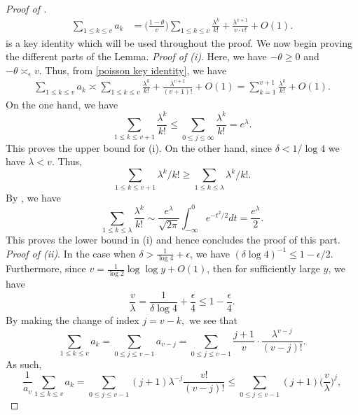 \documentclass{amsart}
\theoremstyle{definition}
\numberwithin{equation}{section}
\newcommand{\density}{\delta}
\begin{document}
\begin{proof}[Proof of ]
	\begin{align}\label{poisson key identity}
		\sum_{1 \leq k \leq v}a_k &= \bigg(\frac{1-\theta}{v}\bigg)\sum_{1 \leq k \leq  v}\frac{\lambda^k}{k!} + \frac{\lambda^{v+1}}{v\cdot v!} +O(1).
	\end{align}
	 is a key identity which will be used throughout the proof. We now begin proving the different parts of the Lemma. 
	\medskip\newline\noindent\textit{Proof of (i)}. Here, we have $- \theta \geq 0$ and $-\theta \asymp_\epsilon v.$ Thus, from \eqref{poisson key identity}, we have
	\begin{align}\label{poisson lemma i eq 1}
		\sum_{1\le k\le v}a_k \asymp \sum_{1\le k\le v}\frac{\lambda^k}{k!} + \frac{\lambda^{v+1}}{(v+1)!}+O(1) =  \sum_{k=1}^{v+1} \frac{\lambda^k}{k!}+O(1).
	\end{align}
	On the one hand, we have
	$$ \sum_{1 \leq k \leq v+1} \frac{\lambda^k}{k!} \leq \sum_{0 \leq j \leq \infty}\frac{\lambda^k}{k!} = e^\lambda.$$
	This proves the upper bound for (i). On the other hand, since $\delta < 1/\log 4$ we have $\lambda < v$. Thus, \begin{equation}\label{eq cite for part iv 1}
		\sum_{1\le k\le v+1}\lambda^k/k!  \ge \sum_{1\le k\le \lambda}\lambda^k/k!.
	\end{equation}
	By , we have
	\begin{equation}\label{eq cite for part iv 2}
		\sum_{1\le k\le \lambda}\frac{\lambda^k}{k!} \sim \frac{e^\lambda}{\sqrt{2 \pi}} \int_{-\infty}^{0}e^{-t^2/2}dt = \frac{e^{\lambda}}{2}.
	\end{equation}
	This proves the lower bound in (i) and hence concludes the proof of this part.
	\noindent\medskip\newline\textit{Proof of (ii)}. In the case when $\density > \frac{1}{\log 4}+\epsilon$, we have $(\delta \log 4)^{-1} \leq 1-\epsilon/2$. Furthermore, since $v = \frac{1}{\log 2} \log \log y + O(1)$, then for sufficiently large $y$, we have 
	\begin{equation}\label{eq poisson lemma v/lambda}
		\frac{v}{\lambda} = \frac{1}{\delta \log 4} + \frac{\epsilon}{4} \leq 1 - \frac{\epsilon}{4}.
	\end{equation}
	By making the change of index $j = v-k,$ we see that
	$$\sum_{1 \leq k \leq v} a_k = \sum_{0 \leq j \leq v-1}a_{v-j} = \sum_{0 \leq j \leq v-1}\frac{j+1}{v}\cdot \frac{\lambda^{v-j}}{(v-j)!}.$$
	As such,
	$$\frac{1}{a_v}\sum_{1 \leq k \leq v} a_k = \sum_{0 \leq j \leq v-1} (j+1) \lambda^{-j} \frac{v!}{(v-j)!} \leq \sum_{0 \leq j \leq v-1} (j+1) \Big(\frac{v}{\lambda}\Big)^j,$$

\end{proof}
\end{document}
